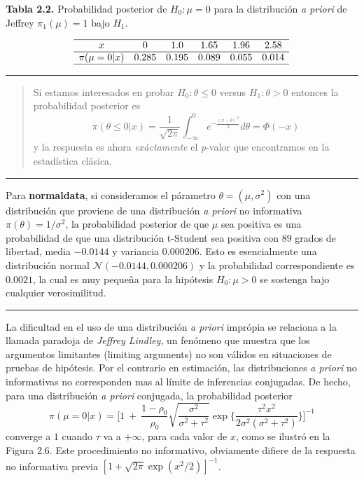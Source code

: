 \documentclass[12pt,]{article}
\begin{document}
\textbf{Tabla 2.2.} Probabilidad posterior de \(H_0:\mu=0\) para la
distribución \emph{a priori} de Jeffrey \(\pi_1(\mu)=1\) bajo \(H_1\).

\[
\begin{array}{cccccc}
\hline
x              & 0     & 1.0   & 1.65  & 1.96  & 2.58  \\ \hline
\pi(\mu=0|x)   & 0.285 & 0.195 & 0.089 & 0.055 & 0.014 \\ \hline
\end{array}
\]

\begin{center}\rule{0.5\linewidth}{\linethickness}\end{center}

\begin{quote}
Si estamos interesados en probar \(H_0: \theta\le 0\) versus
\(H_1:\theta>0\) entonces la probabilidad posterior es \[
\pi(\theta\le 0|x)=\frac{1}{\sqrt{2\pi}}\int_{-\infty}^0 e^{-\frac{(x-\theta)^2}{2}}d\theta=\Phi(-x)
\] y la respuesta es ahora \emph{exáctamente} el \emph{p}-valor que
encontramos en la estadística clásica.
\end{quote}

\begin{center}\rule{0.5\linewidth}{\linethickness}\end{center}

Para \textbf{normaldata}, si consideramos el párametro
\(\theta=(\mu,\sigma^2)\) con una distribución que proviene de una
distribución \emph{a priori} no informativa \(\pi(\theta)=1/\sigma^2\),
la probabilidad posterior de que \(\mu\) sea positiva es una
probabilidad de que una distribución t-Student sea positiva con \(89\)
grados de libertad, media \(-0.0144\) y variancia \(0.000206\). Esto es
esencialmente una distribución normal \(\mathcal{N}(-0.0144,0.000206)\)
y la probabilidad correspondiente es \(0.0021\), la cual es muy pequeña
para la hipótesis \(H_0:\mu>0\) se sostenga bajo cualquier
verosimilitud.

\begin{center}\rule{0.5\linewidth}{\linethickness}\end{center}

La dificultad en el uso de una distribución \emph{a priori} imprópia se
relaciona a la llamada paradoja de \emph{Jeffrey Lindley}, un fenómeno
que muestra que los argumentos limitantes (limiting arguments) no son
válidos en situaciones de pruebas de hipótesis. Por el contrario en
estimación, las distribuciones \emph{a priori} no informativas no
corresponden mas al límite de inferencias conjugadas. De hecho, para una
distribución \emph{a priori} conjugada, la probabilidad posterior \[
\pi(\mu=0|x)=\bigg[1\ +\ \frac{1-\rho_0}{\rho_0} \displaystyle \sqrt{\frac{\sigma^2}{\sigma^2+\tau^2}}\exp\bigg\{\frac{\tau^2x^2}{2\sigma^2(\sigma^2+\tau^2)} \bigg\}\bigg]^{-1}
\] converge a \(1\) cuando \(\tau\) va a \(+\infty\), para cada valor de
\(x\), como se ilustró en la Figura 2.6. Este procedimiento no
informativo, obviamente difiere de la respuesta no informativa previa
\([1+\sqrt{2\pi}\exp(x^2/2)]^{-1}\).
\end{document}
